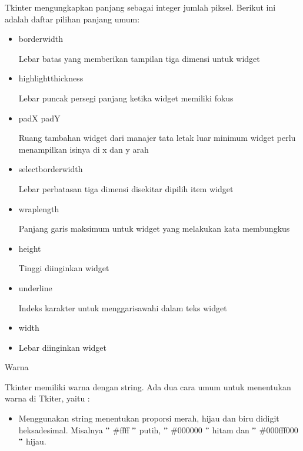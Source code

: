 \documentclass[a4paper,12pt]{report}
\begin{document}
\begin{myEnumerate}
 \hspace*{0.5in} \vspace{12pt}
 \hspace*{0.5in} Tkinter mengungkapkan panjang sebagai integer jumlah piksel. Berikut ini adalah daftar pilihan panjang umum: \par
\noindent 
\begin{itemize}
\item borderwidth \par
Lebar batas yang memberikan tampilan tiga dimensi untuk widget \par
\noindent 
\item highlightthickness \par
Lebar puncak persegi panjang ketika widget memiliki fokus \par
\noindent 
\item padX padY \par
Ruang tambahan widget dari manajer tata letak luar minimum widget perlu menampilkan isinya di x dan y arah \par
\noindent 
\item selectborderwidth \par
Lebar perbatasan tiga dimensi disekitar dipilih item widget \par
\noindent 
\item wraplength \par
Panjang garis maksimum untuk widget yang melakukan kata membungkus \par
\noindent 
\item height \par
Tinggi diinginkan widget \par
\noindent 
\item underline \par
Indeks karakter untuk menggarisawahi dalam teks widget  \par
\noindent 
\item width \par
\noindent 
\item Lebar diinginkan widget\end{itemize}
 \par
\noindent 
\item Warna \par
\noindent 
Tkinter memiliki warna dengan string. Ada dua cara umum untuk menentukan warna di Tkiter, yaitu : \par
\noindent 
\begin{itemize}
\item Menggunakan string menentukan proporsi merah, hijau dan biru didigit heksadesimal. Misalnya  $ " $ $  \#  $ffff $ " $ putih,  $ " $ $  \#  $000000 $ " $ hitam dan  $ " $ $  \#  $000fff000 $ " $ hijau. \par

\end{itemize}
\end{myEnumerate}
\end{document}
